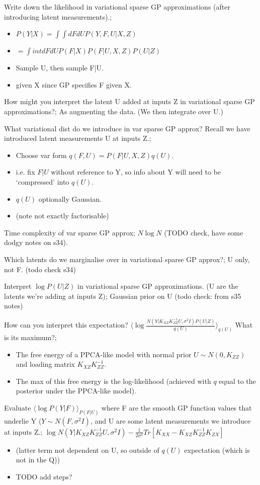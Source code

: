 \documentclass{article}
\begin{document}
Write down the likelihood in variational sparse GP approximations (after introducing latent measurements).; \begin{itemize}
    \item $P(Y|X)=\int \int dFdU P(Y, F, U|X, Z)$
    \item $=\int int dFdU P(F|X)P(F|U, X, Z)P(U|Z)$
    \item Sample U, then sample F|U.
    \item given X since GP specifies F given X.
\end{itemize}

How might you interpret the latent U added at inputs Z in variational sparse GP approximations?; As augmenting the data. (We then integrate over U.)

What variational dist do we introduce in var sparse GP approx? Recall we have introduced latent measurements U at inputs Z.; \begin{itemize}
    \item Choose var form $q(F, U)=P(F|U, X, Z)q(U)$. 
    \item i.e. fix $F|U$ without reference to Y, so info about Y will need to be `compressed' into $q(U)$.
    \item $q(U)$ optionally Gaussian.
    \item (note not exactly factorisable)
\end{itemize}

Time complexity of var sparse GP approx; $N\log N$ (TODO check, have some dodgy notes on s34).

Which latents do we marginalise over in variational sparse GP approx?; U only, not F. (todo check s34)

Interpret $\log P(U|Z)$ in variational sparse GP approximations. (U are the latents we're adding at inputs Z); Gaussian prior on U (todo check: from s35 notes)

How can you interpret this expectation? $\langle \log \frac{N(Y|K_{XZ}K_{ZZ}^{-1}U, \sigma^2I)P(U|Z)}{q(U)}\rangle_{q(U)}$ What is its maximum?; \begin{itemize}
    \item The free energy of a PPCA-like model with normal prior $U\sim N(0, K_{ZZ})$ and loading matrix $K_{XZ}K_{ZZ}^{-1}$.
    \item The max of this free energy is the log-likelihood (achieved with $q$ equal to the posterior under the PPCA-like model).
\end{itemize}

Evaluate $\langle \log P(Y|F)\rangle_{P(F|U)}$ where F are the smooth GP function values that underlie Y ($Y\sim N(F, \sigma^2I)$, and U are some latent measurements we introduce at inputs Z.; $\log N(Y|K_{XZ}K_{ZZ}^{-1}U, \sigma^2I)-\frac{1}{2\sigma^2}Tr[K_{XX}-K_{XZ}K_{ZZ}^{-1}K_{ZX}]$
    \begin{itemize}
        \item (latter term not dependent on U, so outside of $q(U)$ expectation (which is not in the Q))
        \item TODO add steps?
    \end{itemize}
\end{document}
